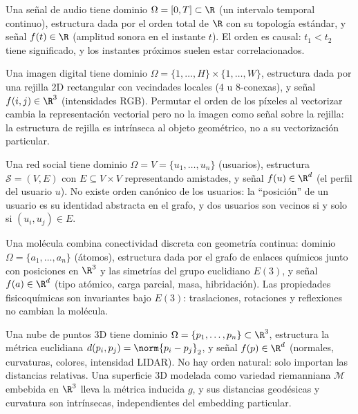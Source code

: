 \begin{example}
\label{ex:found:audio}
Una se\~nal de audio tiene dominio $\Omega = [0,T] \subset \R$ (un intervalo
temporal continuo), estructura dada por el orden total de $\R$ con su topolog\'ia
est\'andar, y se\~nal $f(t) \in \R$ (amplitud sonora en el instante $t$). El orden
es causal: $t_1 < t_2$ tiene significado, y los instantes pr\'oximos suelen estar
correlacionados.
\end{example}

\begin{example}
\label{ex:found:image}
Una imagen digital tiene dominio $\Omega = \{1,\ldots,H\} \times \{1,\ldots,W\}$,
estructura dada por una rejilla 2D rectangular con vecindades locales (4 u
8-conexas), y se\~nal $f(i,j) \in \R^3$ (intensidades RGB). Permutar el orden de
los p\'ixeles al vectorizar cambia la representaci\'on vectorial pero no la imagen
como se\~nal sobre la rejilla: la estructura de rejilla es intr\'inseca al objeto
geom\'etrico, no a su vectorizaci\'on particular.
\end{example}

\begin{example}
\label{ex:found:graph}
Una red social tiene dominio $\Omega = V = \{u_1, \ldots, u_n\}$ (usuarios),
estructura $\mathcal{S} = (V, E)$ con $E \subseteq V \times V$ representando
amistades, y se\~nal $f(u) \in \R^d$ (el perfil del usuario $u$). No existe orden
can\'onico de los usuarios: la ``posici\'on'' de un usuario es su identidad
abstracta en el grafo, y dos usuarios son vecinos si y solo si $(u_i, u_j) \in E$.
\end{example}

\begin{example}
\label{ex:found:molecule}
Una mol\'ecula combina conectividad discreta con geometr\'ia continua: dominio
$\Omega = \{a_1, \ldots, a_n\}$ (\'atomos), estructura dada por el grafo de enlaces
qu\'imicos junto con posiciones en $\R^3$ y las simetr\'ias del grupo euclidiano
$E(3)$, y se\~nal $f(a) \in \R^d$ (tipo at\'omico, carga parcial, masa,
hibridaci\'on). Las propiedades fisicoqu\'imicas son invariantes bajo $E(3)$:
traslaciones, rotaciones y reflexiones no cambian la mol\'ecula.
\end{example}

\begin{example}
\label{ex:found:pointcloud}
Una nube de puntos 3D tiene dominio $\Omega = \{p_1, \ldots, p_n\} \subset \R^3$,
estructura la m\'etrica euclidiana $d(p_i, p_j) = \norm{p_i - p_j}_2$, y se\~nal
$f(p) \in \R^d$ (normales, curvaturas, colores, intensidad LIDAR). No hay orden
natural: solo importan las distancias relativas. Una superficie 3D modelada como
variedad riemanniana $\mathcal{M}$ embebida en $\R^3$ lleva la m\'etrica inducida
$g$, y sus distancias geod\'esicas y curvatura son intr\'insecas, independientes
del embedding particular.
\end{example}

